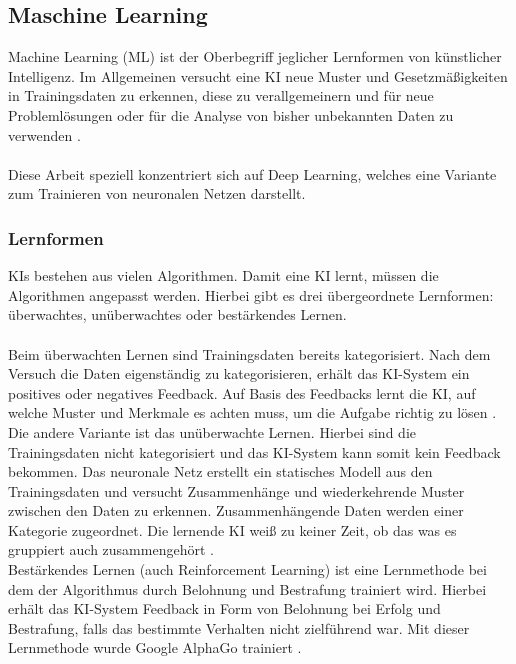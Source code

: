 \documentclass[12pt,oneside,a4paper,parskip]{scrbook}
\begin{document}
\subsection{Maschine Learning}
Machine Learning (ML) ist der Oberbegriff jeglicher Lernformen von künstlicher Intelligenz. Im Allgemeinen versucht eine KI neue Muster und Gesetzmäßigkeiten in Trainingsdaten zu erkennen, diese zu verallgemeinern und für neue Problemlösungen oder für die Analyse von bisher unbekannten Daten zu verwenden \cite{EliminateHumanBias}.
\\\\Diese Arbeit speziell konzentriert sich auf Deep Learning, welches eine Variante zum Trainieren von neuronalen Netzen darstellt.
\subsubsection{Lernformen}
KIs bestehen aus vielen Algorithmen. Damit eine KI lernt, müssen die Algorithmen angepasst werden. Hierbei gibt es drei übergeordnete Lernformen: überwachtes, unüberwachtes oder bestärkendes Lernen. \\\\
Beim überwachten Lernen sind Trainingsdaten bereits kategorisiert. Nach dem Versuch die Daten eigenständig zu kategorisieren, erhält das KI-System ein positives oder negatives Feedback. Auf Basis des Feedbacks lernt die KI, auf welche Muster und Merkmale es achten muss, um die Aufgabe richtig zu lösen \cite{Grundlagen}. \\
Die andere Variante ist das unüberwachte Lernen. Hierbei sind die Trainingsdaten nicht kategorisiert und das KI-System kann somit kein Feedback bekommen. Das neuronale Netz erstellt ein statisches Modell aus den Trainingsdaten und versucht Zusammenhänge und wiederkehrende Muster zwischen den Daten zu erkennen. Zusammenhängende Daten werden einer Kategorie zugeordnet. Die lernende KI weiß zu keiner Zeit, ob das was es gruppiert auch zusammengehört \cite{Grundlagen}.\\
Bestärkendes Lernen (auch Reinforcement Learning) ist eine Lernmethode bei dem der Algorithmus durch Belohnung und Bestrafung trainiert wird. Hierbei erhält das KI-System Feedback in Form von Belohnung bei Erfolg und Bestrafung, falls das bestimmte Verhalten nicht zielführend war. Mit dieser Lernmethode wurde Google AlphaGo trainiert \cite{Grundlagen}.
\end{document}
